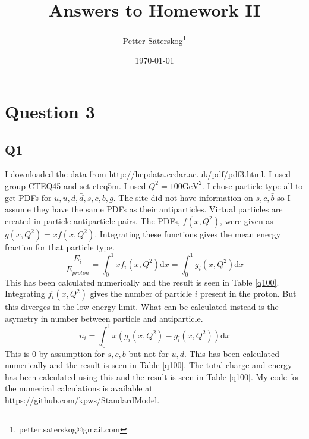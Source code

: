 \documentclass[a4paper,10pt]{article}
\title{Answers to Homework II}
\author{Petter S\"{a}terskog\footnote{petter.saterskog@gmail.com}}
\date{\today}
\begin{document}
\maketitle

\section{Question 3}
\subsection{Q1}
I downloaded the data from \url{http://hepdata.cedar.ac.uk/pdf/pdf3.html}. I used group CTEQ45 and set cteq5m. I used $Q^2=100 \mathrm{GeV}^2$. I chose particle type all to get PDFs for $u, \bar{u}, d, \bar{d}, s, c, b, g$. The site did not have information on $\bar{s}, \bar{c}, \bar{b}$ so I assume they have the same PDFs as their antiparticles. Virtual particles are created in particle-antiparticle pairs. The PDFs, $f(x,Q^2)$, were given as $g(x,Q^2)=xf(x,Q^2)$. Integrating these functions gives the mean energy fraction for that particle type.
\begin{equation}
 \frac{E_i}{E_{proton}}=\int_0^1xf_i(x,Q^2)\mathrm{d}x=\int_0^1g_i(x,Q^2)\mathrm{d}x
\end{equation}
This has been calculated numerically and the result is seen in Table \ref{q100}.\\
Integrating $f_i(x,Q^2)$ gives the number of particle $i$ present in the proton. But this diverges in the low energy limit. What can be calculated instead is the asymetry in number between particle and antiparticle.
\begin{equation}
 n_i=\int_0^1x(g_i(x,Q^2)-g_{\bar{i}}(x,Q^2))\mathrm{d}x
\end{equation}
This is 0 by assumption for $s, c, b$ but not for $u, d$. This has been calculated numerically and the result is seen in Table \ref{q100}. The total charge and energy has been calculated using this and the result is seen in Table \ref{q100}. My code for the numerical calculations is available at \url{https://github.com/kpws/StandardModel}.
\end{document}
